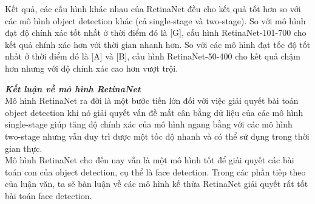 {    Kết quả, các cấu hình khác nhau của RetinaNet đều cho kết quả tốt hơn so với các mô hình object detection khác (cả single-stage và two-stage).
    So với mô hình đạt độ chính xác tốt nhất ở thời điểm đó là [G], cấu hình RetinaNet-101-700 cho kết quả chính xác hơn với thời gian nhanh hơn.
    So với các mô hình đạt tốc độ tốt nhất ở thời điểm đó là [A] và [B], cấu hình RetinaNet-50-400 cho kết quả chậm hơn nhưng với độ chính xác cao hơn vượt trội.

    \noindent
    \textbf{\textit{Kết luận về mô hình RetinaNet}} \\
    Mô hình RetinaNet ra đời là một bước tiến lớn đối với việc giải quyết bài toán object detection khi nó giải quyết vấn đề mất cân bằng dữ liệu của các mô hình single-stage giúp tăng độ chính xác của mô hình ngang bằng với các mô hình two-stage nhưng vẫn duy trì được một tốc độ nhanh và có thể sử dụng trong thời gian thực. \\
    Mô hình RetinaNet cho đến nay vẫn là một mô hình tốt để giải quyết các bài toán con của object detection, cụ thể là face detection.
    Trong các phần tiếp theo của luận văn, ta sẽ bàn luận về các mô hình kế thừa RetinaNet giải quyết rất tốt bài toán face detection.
}